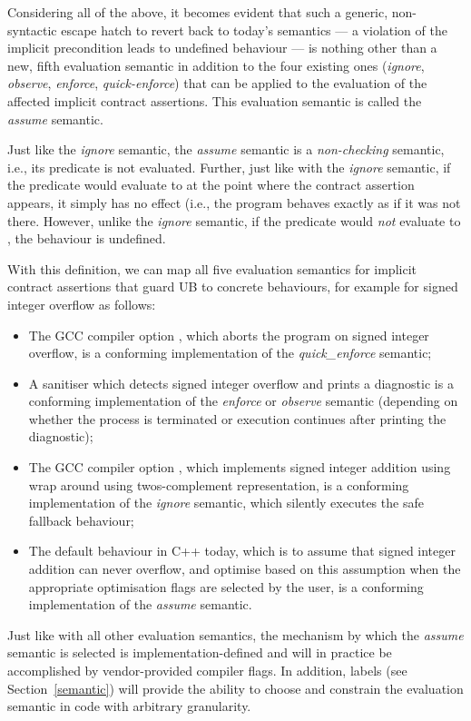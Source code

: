Considering all of the above, it becomes evident that such a generic, non-syntactic escape hatch to revert back to today's semantics --- a violation of the implicit precondition leads to undefined behaviour --- is nothing other than a new, fifth evaluation semantic in addition to the four existing ones (\emph{ignore}, \emph{observe}, \emph{enforce}, \emph{quick-enforce}) that can be applied to the evaluation of the affected implicit contract assertions. This evaluation semantic is called the \emph{assume} semantic.

Just like the \emph{ignore} semantic, the \emph{assume} semantic is a \emph{non-checking} semantic, i.e., its predicate is not evaluated. Further, just like with the \emph{ignore} semantic, if the predicate would  evaluate to  at the point where the contract assertion appears, it simply has no effect (i.e., the program behaves exactly as if it was not there. However, unlike the \emph{ignore} semantic, if the predicate would \emph{not} evaluate to , the behaviour is undefined.

With this definition, we can map all five evaluation semantics for implicit contract assertions that guard UB to concrete behaviours, for example for signed integer overflow as follows:
\begin{itemize}
\item The GCC compiler option , which aborts the program on signed integer overflow, is a conforming implementation of the \emph{quick_enforce} semantic;
\item A sanitiser which detects signed integer overflow and prints a diagnostic is a conforming
implementation of the \emph{enforce} or \emph{observe} semantic (depending on whether the
process is terminated or execution continues after printing the diagnostic);
\item The GCC compiler option , which implements signed integer addition using wrap around using twos-complement representation, is a conforming implementation of the \emph{ignore} semantic, which silently executes the safe fallback behaviour;
\item The default behaviour in C++ today, which is to assume that signed integer addition can never overflow, and optimise based on this assumption when the appropriate optimisation flags are selected by the user, is a conforming implementation of the \emph{assume} semantic.
\end{itemize}
Just like with all other evaluation semantics, the mechanism by which the \emph{assume} semantic is selected is implementation-defined and will in practice be accomplished by vendor-provided compiler flags. In addition, labels (see Section~\ref{semantic}) will provide the ability to choose and constrain the evaluation semantic in code with arbitrary granularity.

